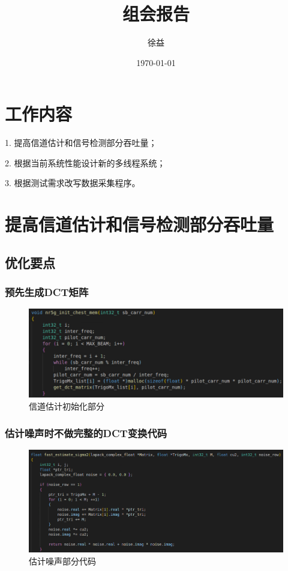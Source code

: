 \documentclass{article}
\title{组会报告}
\author{徐益}
\date{\today}
\begin{document}
\maketitle


\section{工作内容}
1. 提高信道估计和信号检测部分吞吐量；

2. 根据当前系统性能设计新的多线程系统；

3. 根据测试需求改写数据采集程序。

\section{提高信道估计和信号检测部分吞吐量}
\subsection{优化要点}
\subsubsection{预先生成DCT矩阵}
\begin{figure}[H]
	\centering
	\includegraphics[width = .8\textwidth]{dct.png}
	\caption{信道估计初始化部分}
\end{figure}
\subsubsection{估计噪声时不做完整的DCT变换代码}
\begin{figure}[H]
	\centering
	\includegraphics[width = .8\textwidth]{sigma.png}
	\caption{估计噪声部分代码}
\end{figure}
\end{document}
